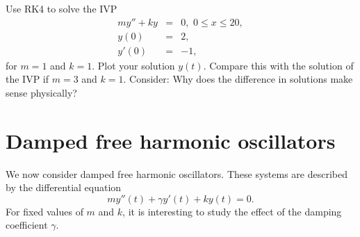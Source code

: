 % 
% 	
% 
% 
% 


\begin{problem}
Use RK4 to solve the IVP
\begin{eqnarray*}
my'' + ky &=& 0,\,\, 0 \leq x \leq 20, \\
y(0) &=& 2, \\
y'(0) &=& -1,
\end{eqnarray*} 
for $m = 1$ and $k =1$.  Plot your solution $y(t)$.  Compare this with the solution of the IVP if  $m = 3$ and $k =1$. Consider: Why does the difference in solutions make sense physically?
\end{problem}

\section*{Damped free harmonic oscillators}
We now consider damped free harmonic oscillators. These systems are described by the differential equation
\[my''(t) +\gamma y'(t) + ky(t) = 0.\]
For fixed values of $m$ and $k$, it is interesting to study the effect of the damping coefficient $\gamma$. 

